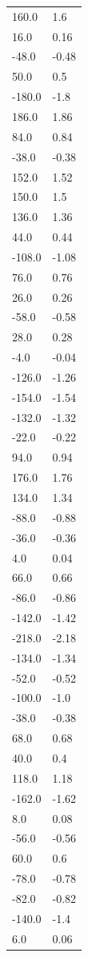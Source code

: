 \begin{longtable}{ll}
160.0 & 1.6 \\
16.0 & 0.16 \\
-48.0 & -0.48 \\
50.0 & 0.5 \\
-180.0 & -1.8 \\
186.0 & 1.86 \\
84.0 & 0.84 \\
-38.0 & -0.38 \\
152.0 & 1.52 \\
150.0 & 1.5 \\
136.0 & 1.36 \\
44.0 & 0.44 \\
-108.0 & -1.08 \\
76.0 & 0.76 \\
26.0 & 0.26 \\
-58.0 & -0.58 \\
28.0 & 0.28 \\
-4.0 & -0.04 \\
-126.0 & -1.26 \\
-154.0 & -1.54 \\
-132.0 & -1.32 \\
-22.0 & -0.22 \\
94.0 & 0.94 \\
176.0 & 1.76 \\
134.0 & 1.34 \\
-88.0 & -0.88 \\
-36.0 & -0.36 \\
4.0 & 0.04 \\
66.0 & 0.66 \\
-86.0 & -0.86 \\
-142.0 & -1.42 \\
-218.0 & -2.18 \\
-134.0 & -1.34 \\
-52.0 & -0.52 \\
-100.0 & -1.0 \\
-38.0 & -0.38 \\
68.0 & 0.68 \\
40.0 & 0.4 \\
118.0 & 1.18 \\
-162.0 & -1.62 \\
8.0 & 0.08 \\
-56.0 & -0.56 \\
60.0 & 0.6 \\
-78.0 & -0.78 \\
-82.0 & -0.82 \\
-140.0 & -1.4 \\
6.0 & 0.06 \\

\end{longtable}
